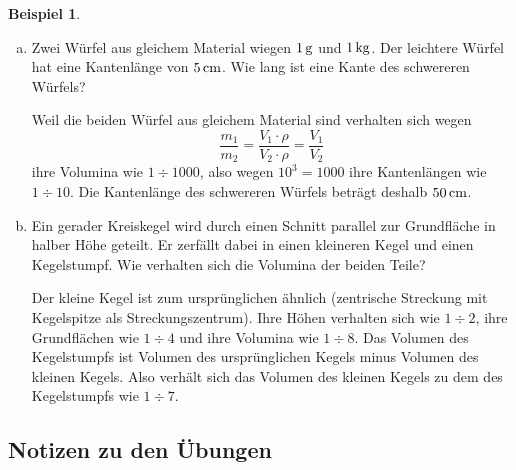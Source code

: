 \documentclass[%
11pt,%
twoside,%
titlepage,%
swissgerman,%
headsepline%
]{scrartcl}
\theoremstyle{definition}
\newtheorem{bsp}{Beispiel}[subsection] %
\theoremstyle{plain}
\begin{document}
\begin{bsp}

\begin{enumerate}[a)]
\item Zwei W\"urfel aus gleichem Material wiegen $\unit[1]{g}$ und $\unit[1]{kg}$. Der leichtere W\"urfel hat eine Kantenl\"ange von $\unit[5]{cm}$. Wie lang ist eine Kante des schwereren W\"urfels?

Weil die beiden W\"urfel aus gleichem Material sind verhalten sich wegen
$$\frac{m_1}{m_2}=\frac{V_1\cdot\rho}{V_2\cdot\rho}=\frac{V_1}{V_2}$$
ihre Volumina wie $1\div1000$, also wegen $10^3=1000$ ihre Kantenl\"angen wie $1\div10$. Die Kantenl\"ange des schwereren W\"urfels betr\"agt deshalb $\unit[50]{cm}$.

\item Ein gerader Kreiskegel wird durch einen Schnitt parallel zur Grundfl\"ache in halber H\"ohe geteilt. Er zerf\"allt dabei in einen kleineren Kegel und einen Kegelstumpf. Wie verhalten sich die Volumina der beiden Teile?

Der kleine Kegel ist zum urspr\"unglichen \"ahnlich (zentrische Streckung mit Kegelspitze als Streckungszentrum). Ihre H\"ohen verhalten sich wie $1\div2$, ihre Grundfl\"achen wie $1\div4$ und ihre Volumina wie $1\div8$. Das Volumen des Kegelstumpfs ist Volumen des urspr\"unglichen Kegels minus Volumen des kleinen Kegels. Also verh\"alt sich das Volumen des kleinen Kegels zu dem des Kegelstumpfs wie $1\div7$.
\end{enumerate}
\end{bsp}

\clearpage

\subsection{Notizen zu den Übungen}
\end{document}

